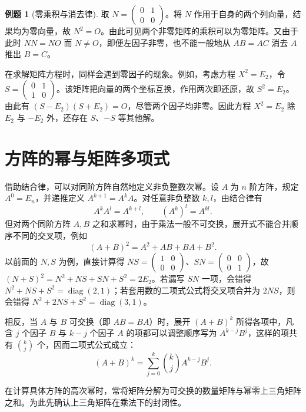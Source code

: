 \documentclass[UTF8,fontset=fandol,a4paper,12pt]{ctexart}
\theoremstyle{definition}
\newtheorem{example}[definition]{例题}
\begin{document}
\begin{example}[零乘积与消去律]
取 $N=\left(\begin{smallmatrix}0&1\\0&0\end{smallmatrix}\right)$。将 $N$ 作用于自身的两个列向量，结果均为零向量，故 $N^2=O$。由此可见两个非零矩阵的乘积可以为零矩阵。又由于此时 $NN=NO$ 而 $N\ne O$，即便左因子非零，也不能一般地从 $AB=AC$ 消去 $A$ 推出 $B=C$。
\end{example}

在求解矩阵方程时，同样会遇到零因子的现象。例如，考虑方程 $X^2=E_2$，令 $S=\left(\begin{smallmatrix}0&1\\1&0\end{smallmatrix}\right)$。该矩阵把向量的两个坐标互换，作用两次即还原，故 $S^2=E_2$。由此有 $(S-E_2)(S+E_2)=O$，尽管两个因子均非零。因此方程 $X^2=E_2$ 除 $E_2$ 与 $-E_2$ 外，还存在 $S$、$-S$ 等其他解。

\section{方阵的幂与矩阵多项式}

借助结合律，可以对同阶方阵自然地定义非负整数次幂。设 $A$ 为 $n$ 阶方阵，规定 $A^0=E_n$，并递推定义 $A^{k+1}=A^kA$。对任意非负整数 $k,l$，由结合律有
\[
 A^kA^l=A^{k+l},\qquad (A^k)^l=A^{kl}.
\]
但对两个同阶方阵 $A,B$ 之和求幂时，由于乘法一般不可交换，展开式不能合并顺序不同的交叉项，例如
\[
  (A+B)^2=A^2+AB+BA+B^2.
\]
以前面的 $N,S$ 为例，直接计算得 $NS=\left(\begin{smallmatrix}1&0\\0&0\end{smallmatrix}\right)$、$SN=\left(\begin{smallmatrix}0&0\\0&1\end{smallmatrix}\right)$，故 $(N+S)^2=N^2+NS+SN+S^2=2E_2$。若漏写 $SN$ 一项，会错得 $N^2+NS+S^2=\operatorname{diag}(2,1)$；若套用数的二项式公式将交叉项合并为 $2NS$，则会错得 $N^2+2NS+S^2=\operatorname{diag}(3,1)$。

相反，当 $A$ 与 $B$ 可交换（即 $AB=BA$）时，展开 $(A+B)^k$ 所得各项中，凡含 $j$ 个因子 $B$ 与 $k-j$ 个因子 $A$ 的项都可以调整顺序写为 $A^{k-j}B^j$，这样的项共有 $\binom{k}{j}$ 个，因而二项式公式成立：
\[
 (A+B)^k=\sum_{j=0}^k\binom{k}{j}A^{k-j}B^j.
\]

在计算具体方阵的高次幂时，常将矩阵分解为可交换的数量矩阵与幂零上三角矩阵之和。为此先确认上三角矩阵在乘法下的封闭性。
\end{document}
